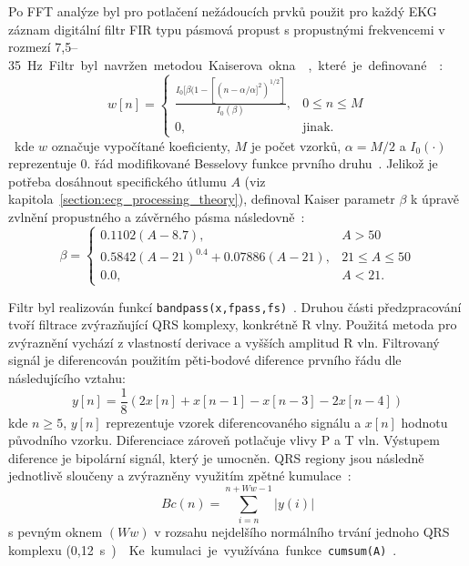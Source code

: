 Po FFT analýze byl pro potlačení nežádoucích prvků použit pro každý EKG záznam
digitální filtr FIR typu pásmová propust s propustnými frekvencemi v rozmezí
7,5--35~\si\Hz. Filtr byl navržen metodou Kaiserova okna~\cite{Chavan2006},
které je definované~\cite{Oppenheim1999}:
\begin{equation}
    \label{eq:kaiser1}
    w[n] =
    \begin{cases}
        \frac{I_0[\beta(1-[(n-\alpha/\alpha]^2)^{1/2}]}{I_0(\beta)}, & 0 \leq n \leq M \\
        0,                                                           & \text{jinak}.
    \end{cases}
\end{equation}
kde $w$ označuje vypočítané koeficienty, $M$ je počet vzorků, $\alpha=M/2$ a
$I_0(\cdot)$ reprezentuje 0. řád modifikované Besselovy funkce prvního
druhu~\cite{BesselFcn}. Jelikož je potřeba dosáhnout specifického útlumu $A$
(viz kapitola~\ref{section:ecg_processing_theory}), definoval Kaiser parametr
$\beta$ k úpravě zvlnění propustného a závěrného pásma
následovně~\cite{Oppenheim1999}:
\begin{equation}
    \beta =
    \begin{cases}
        0.1102(A-8.7),                    & A > 50            \\
        0.5842(A-21)^0.4 + 0.07886(A-21), & 21 \leq A \leq 50 \\
        0.0,                              & A < 21.
    \end{cases}
\end{equation}

Filtr byl realizován funkcí \texttt{bandpass(x,fpass,fs)}~\cite{matlabBANDPASS}.
Druhou části předzpracování tvoří filtrace zvýrazňující QRS komplexy, konkrétně
R vlny. Použitá metoda pro zvýraznění vychází z vlastností derivace a vyšších
amplitud R vln. Filtrovaný signál je diferencován použitím pěti-bodové diference
prvního řádu dle následujícího vztahu:
\begin{equation}
    \label{eq:differentiation}
    y[n] = \frac{1}{8}(2x[n] + x[n-1] - x[n-3] - 2x[n-4])
\end{equation}
kde $n \geq 5$, $y[n]$ reprezentuje vzorek diferencovaného signálu a $x[n]$
hodnotu původního vzorku. Diferenciace zároveň potlačuje vlivy P a T vln.
Výstupem diference je bipolární signál, který je umocněn. QRS regiony jsou
následně jednotlivě sloučeny a zvýrazněny využitím zpětné
kumulace~\cite{Wang2017}:
\begin{equation}
    \label{eq:backward_cumulation}
    Bc(n) = \sum_{i=n}^{n+Ww-1} |y(i)|
\end{equation}
s pevným oknem $(Ww)$ v rozsahu nejdelšího normálního trvání jednoho QRS
komplexu (0,12~\si\s)~\cite{Wang2017}. Ke kumulaci je využívána funkce
\texttt{cumsum(A)}~\cite{matlabCUMSUM}.

